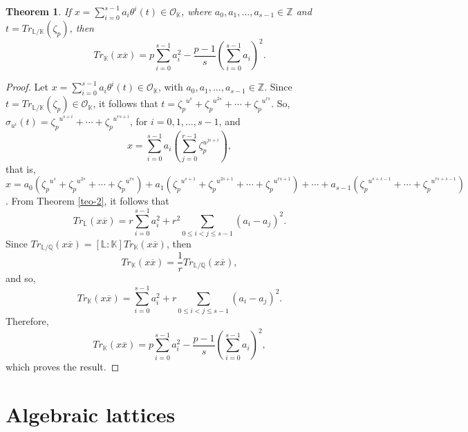 \documentclass{amsart}
\newtheorem{theorem}{Theorem}
\begin{document}

\begin{theorem}\label{prop500} If $x=\displaystyle \sum_{i=0}^{s-1} a_i\theta^i(t) \in \mathcal{O}_{\mathbb{K}}$, where $a_0,a_1,\ldots,a_{s-1}\in\mathbb{Z}$ and $t=Tr_{\mathbb{L}/\mathbb{K}}(\zeta_p)$, then \[ Tr_{\mathbb{K}}(x\overline{x}) = p\sum_{i=0}^{s-1}a_i^2-\frac{p-1}{s}\left(\sum_{i=0}^{s-1}a_i\right)^2 . \] \end{theorem} 
\begin{proof} Let $x=\displaystyle \sum_{i=0}^{s-1} a_i\theta^i(t) \in \mathcal{O}_{\mathbb{K}}$, with $a_0,a_1,\ldots,a_{s-1}\in\mathbb{Z}$. Since $t=Tr_{\mathbb{L}/\mathbb{K}}(\zeta_p)\in \mathcal{O}_{\mathbb{K}}$, it follows that $t={\zeta_p}^{u^s}+{\zeta_p}^{u^{2s}}+\cdots+{\zeta_p}^{u^{rs}}$. So, $\sigma_{u^i}(t)={\zeta_p}^{u^{s+i}}+\cdots+{\zeta_p}^{u^{rs+i}}$, for $i=0,1,\ldots,s-1$, and
$$x = \sum_{i=0}^{s-1} a_i\left(\sum_{j=0}^{r-1}\zeta_p^{u^{js+i}} \right),$$ that is, $x=a_0({\zeta_p}^{u^s}+{\zeta_p}^{u^{2s}}+\cdots+{\zeta_p}^{u^{rs}})+a_1({\zeta_p}^{u^{s+1}}+{\zeta_p}^{u^{2s+1}}+\cdots+{\zeta_p}^{u^{rs+1}})+\cdots+a_{s-1}({\zeta_p}^{u^{s+s-1}}+\cdots+{\zeta_p}^{u^{rs+s-1}})$. 
From Theorem \ref{teo-2}, it follows that \[ Tr_{\mathbb{L}}(x\overline{x}) = r\sum_{i=0}^{s-1}a{_{i}^{2}} + {r^2}\sum_{0\leq i < j \leq s-1}^{}{(a_i - a_j)}^{2}. \] Since  $Tr_{\mathbb{L}/\mathbb{Q}}(x\overline{x}) = [\mathbb{L}:\mathbb{K}] Tr_{\mathbb{K}}(x\overline{x})$, then
$$Tr_{\mathbb{K}}(x\overline{x})=\frac{1}{r}Tr_{\mathbb{L}/\mathbb{Q}}(x\overline{x}),$$ and so, \[ Tr_{\mathbb{K}}(x\overline{x})=\sum_{i=0}^{s-1}a_{i}^{2} + r\sum_{0 \leq i < j \leq s-1}^{}{(a_i - a_j)}^{2}. \] Therefore, \[ Tr_{\mathbb{K}}(x\overline{x}) = p\sum_{i=0}^{s-1}a_i^2-\frac{p-1}{s} \left(\sum_{i=0}^{s-1}a_i\right)^2, \] which proves the result. \end{proof} 

\section{Algebraic lattices} \label{sec-4}
\end{document}
